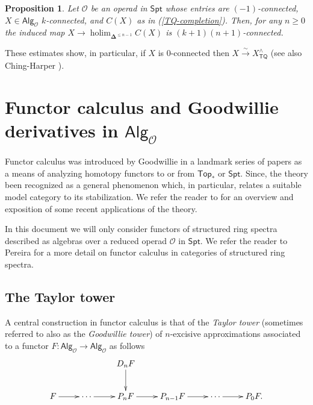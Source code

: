 \documentclass[11pt]{amsart}
\newtheorem{proposition}[subsection]{Proposition}
\theoremstyle{definition}
\theoremstyle{remark}
\newcommand{\Top}{\mathsf{Top}_*}
\newcommand{\Spt}{\mathsf{Spt}}
\newcommand{\TQ}{\mathsf{TQ}}
\newcommand{\holim}{\operatorname{holim}}
\newcommand{\Alg}[1]{ {\mathsf{Alg}_{\mathcal{#1}}} }
\newcommand{\Cal}[1]{\mathcal{#1}}
\newcommand{\bdel}{\mathbf{\Delta}}
\begin{document}
\begin{proposition}
\label{higher-stabilization}
    Let $\Cal{O}$ be an operad in $\Spt$ whose entries are $(-1)$-connected, $X \in \Alg{O}$ $k$-connected, and $C(X)$ as in (\ref{TQ-completion}). Then, for any $n\geq 0$ the induced map $X\to \holim_{\bdel^{\leq n-1}}C(X)$ is $(k+1)(n+1)$-connected.
\end{proposition}

These estimates show, in particular, if $X$ is $0$-connected then $X\xrightarrow{\sim} X_{\TQ}^{\wedge}$ (see also Ching-Harper \cite{Ching-Harper-BM}). 

\section{Functor calculus and Goodwillie derivatives in $\Alg{O}$}
Functor calculus was introduced by Goodwillie in a landmark series of papers \cite{Goo-Calc1, Goo-Calc2,Goo-Calc3} as a means of analyzing homotopy functors to or from $\Top$ or $\Spt$. Since, the theory been recognized as a general phenomenon which, in particular, relates a suitable model category to its stabilization. We refer the reader to \cite{Handbook} for an overview and exposition of some recent applications of the theory. 

In this document we will only consider functors of structured ring spectra described as algebras over a reduced operad $\Cal{O}$ in $\Spt$. We refer the reader to Pereira \cite{Per-thesis} for a more detail on functor calculus in categories of structured ring spectra.

\subsection{The Taylor tower}
A central construction in functor calculus is that of the \textit{Taylor tower} (sometimes referred to also as the \textit{Goodwillie tower}) of $n$-excisive approximations associated to a  functor $F\colon \Alg{O}\to\Alg{O}$ as follows
\begin{equation}\label{Taylor-tower}
    \xymatrix{
    & & D_nF\ar[d] & &&\\
    F\ar[r] & \cdots \ar[r] & P_nF \ar[r] & P_{n-1}F \ar[r] & \cdots \ar[r] & P_0F.}
\end{equation}
\end{document}
